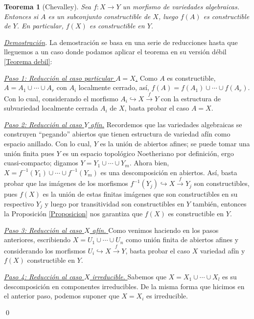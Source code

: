 \documentclass[12pt]{article}
\theoremstyle{customTheorem}
\newtheorem{theorem}{Teorema}[section]
\theoremstyle{customDefinition}
\renewenvironment{proof}[1][Demostración]{\noindent \textit{\underline{#1}.\hspace{2mm}}}{\hfill\qed}
\newenvironment{Theorem}{\begin{tcolorbox}[colback=OliveGreen!18] \begin{theorem}}{ \end{theorem} \end{tcolorbox}}
\begin{document}
\begin{Theorem}[Chevalley]\label{Teorema}
    Sea $f : X \to Y$ un morfismo de variedades algebraicas. Entonces si $A$ es un subconjunto constructible de $X$, luego $f(A)$ es constructible de $Y$. En particular, $f(X)$ es constructible en $Y$.
\end{Theorem}
\begin{proof}
    La demostración se basa en una serie de reducciones hasta que lleguemos a un caso donde podamos aplicar el teorema en su versión débil \ref{Teorema debil}:

    \underline{\textit{Paso 1: Reducción al caso particular $A = X$.}} Como $A$ es constructible, $A = A_1 \cup \cdots \cup A_r$ con $A_i$ localmente cerrado, así, $f(A) = f(A_1) \cup \cdots \cup f(A_r)$. Con lo cual, considerando el morfismo $A_i \hookrightarrow X \overset{f}{\to} Y$ con la estructura de subvariedad localmente cerrada $A_i$ de $X$, basta probar el caso $A = X$.

    \underline{\textit{Paso 2: Reducción al caso $Y$ afín.}} Recordemos que las variedades algebraicas se construyen ``pegando'' abiertos que tienen estructura de variedad afín como espacio anillado. Con lo cual, $Y$ es la unión de abiertos afines; se puede tomar una unión finita pues $Y$ es un espacio topológico Noetheriano por definición, ergo cuasi-compacto; digamos $Y = Y_1 \cup \cdots \cup Y_m$. Ahora bien, $X = f^{-1} (Y_1) \cup \cdots \cup f^{-1} (Y_m)$ es una descomposición en abiertos. Así, basta probar que las imágenes de los morfismos $f^{-1} (Y_j) \hookrightarrow X \overset{f}{\to} Y_j$ son constructibles, pues $f(X)$ es la unión de estas finitas imágenes que son constructibles en su respectivo $Y_j$ y luego por transitividad son constructibles en $Y$ también, entonces la Proposición \ref{Proposicion} nos garantiza que $f(X)$ es constructible en $Y$.

    \underline{\textit{Paso 3: Reducción al caso $X$ afín. }} Como venimos haciendo en los pasos anteriores, escribiendo $X = U_1 \cup \cdots \cup U_n$ como unión finita de abiertos afines y considerando los morfismos $U_i \hookrightarrow X \overset{f}{\to} Y$, basta probar el caso $X$ variedad afín y $f(X)$ constructible en $Y$.

    \underline{\textit{Paso 4: Reducción al caso $X$ irreducible. }} Sabemos que $X = X_1 \cup \cdots \cup X_l$ es su descomposición en componentes irreducibles. De la misma forma que hicimos en el anterior paso, podemos suponer que $X = X_i$ es irreducible.


\end{proof}
\end{document}
